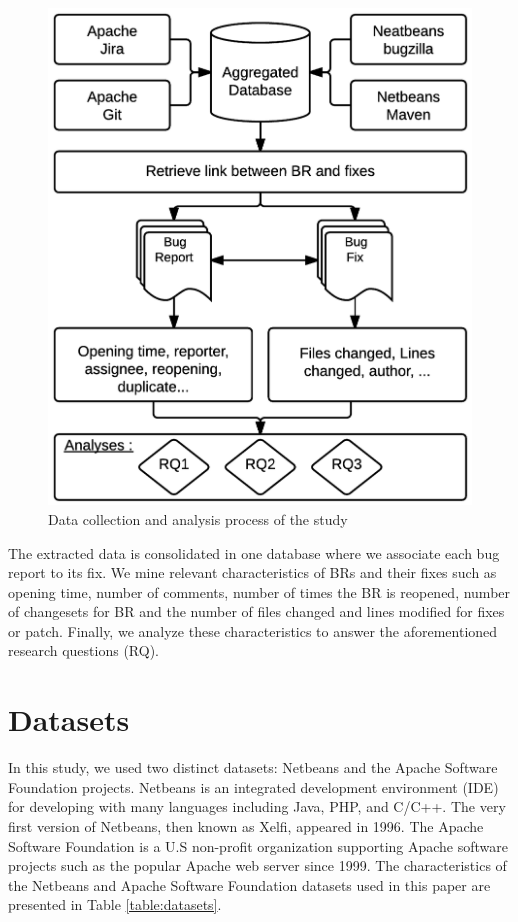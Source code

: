 \begin{figure}[h!]
  \centering
    \includegraphics{media/bug-taxo-flow.png}
    \caption{Data collection and analysis process of the study
    \label{fig:bug-taxo-flow}}
\end{figure}


The extracted data is
consolidated in one database where we associate each bug
report to its fix. We mine relevant characteristics of BRs and
their fixes such as opening time, number of comments,
number of times the BR is reopened, number of changesets
for BR and the number of files changed and lines modified
for fixes or patch. Finally, we analyze these characteristics to
answer the aforementioned research questions (RQ).


\section{Datasets}

In this study, we used two distinct datasets: Netbeans and
the Apache Software Foundation projects. Netbeans is an
integrated development environment (IDE) for developing
with many languages including Java, PHP, and C/C++. The
very first version of Netbeans, then known as Xelfi, appeared
in 1996. The Apache Software Foundation is a U.S non-profit
organization supporting Apache software projects such as the
popular Apache web server since 1999. The characteristics of
the Netbeans and Apache Software Foundation datasets used
in this paper are presented in Table \ref{table:datasets}.

